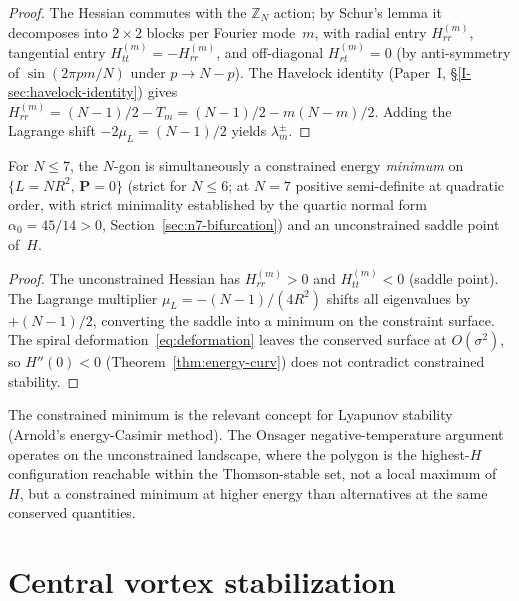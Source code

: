 \begin{proof}
The Hessian commutes with the $\mathbb{Z}_N$ action;
by Schur's lemma it decomposes into $2 \times 2$ blocks
per Fourier mode~$m$, with radial entry $H_{rr}^{(m)}$,
tangential entry $H_{tt}^{(m)} = -H_{rr}^{(m)}$,
and off-diagonal $H_{rt}^{(m)} = 0$
(by anti-symmetry of $\sin(2\pi pm/N)$ under $p \to N{-}p$).
The Havelock identity
(Paper~I, \S\ref*{I-sec:havelock-identity})
gives $H_{rr}^{(m)} = (N{-}1)/2 - T_m = (N{-}1)/2 - m(N{-}m)/2$.
Adding the Lagrange shift $-2\mu_L = (N{-}1)/2$
yields $\lambda_m^\pm$.
\end{proof}

\begin{corollary}
\label{cor:min-not-max}
For $N \le 7$, the $N$-gon is simultaneously a constrained energy
\emph{minimum} on $\{L = NR^2,\, \mathbf{P} = 0\}$ (strict for
$N \le 6$; at $N = 7$ positive semi-definite at quadratic order,
with strict minimality established by the quartic normal form
$\alpha_0 = 45/14 > 0$, Section~\ref{sec:n7-bifurcation})
and an unconstrained saddle point of~$H$.
\end{corollary}

\begin{proof}
The unconstrained Hessian has $H_{rr}^{(m)} > 0$ and
$H_{tt}^{(m)} < 0$ (saddle point).
The Lagrange multiplier $\mu_L = -(N-1)/(4R^2)$ shifts all
eigenvalues by $+(N-1)/2$, converting the saddle into a minimum
on the constraint surface.
The spiral deformation~\eqref{eq:deformation} leaves the
conserved surface at $O(\sigma^2)$, so $H''(0) < 0$
(Theorem~\ref{thm:energy-curv}) does not contradict constrained
stability.
\end{proof}

\begin{remark}
The constrained minimum is the relevant concept for Lyapunov
stability (Arnold's energy-Casimir method).
The Onsager negative-temperature argument operates on the
unconstrained landscape, where the polygon is the
highest-$H$ configuration reachable within the
Thomson-stable set, not a local maximum of~$H$, but a
constrained minimum at higher energy than alternatives at
the same conserved quantities.
\end{remark}


\section{Central vortex stabilization}
\label{sec:central-vortex}

